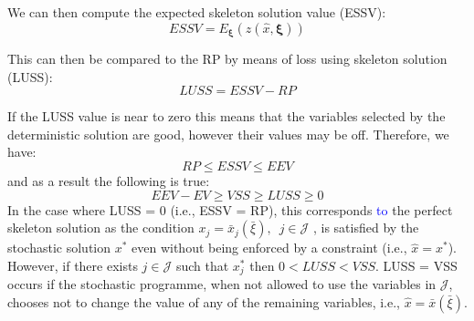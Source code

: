 \documentclass[../thesis.tex]{subfiles}
\begin{document}
{We can then compute the expected skeleton solution value (ESSV):
\vspace{-.1cm}
\begin{equation}\label{eq:ESSV}
    ESSV = E_{\boldsymbol{\xi}}(z(\hat x, \boldsymbol{\xi}))
\end{equation}

This can then be compared to the RP by means of loss using skeleton solution (LUSS):
\vspace{-0.1cm}
\begin{equation}\label{eq:LUSS}
    LUSS = ESSV - RP
\end{equation}

If the LUSS value is near to zero this means that the variables selected by the deterministic solution are good, however their values may be off. Therefore, we have:
\begin{equation}
    RP \leq ESSV \leq EEV
\end{equation}
and as a result the following is true:
\begin{equation}
    EEV - EV \geq VSS \geq LUSS \geq 0
\end{equation}
In the case where LUSS = 0 (i.e., ESSV = RP), this corresponds \textcolor{blue}{to} the perfect skeleton solution as the condition $x_{j} = \bar x_{j} (\bar \xi), \enspace j \in \mathcal{J}$ , is satisfied by the stochastic solution $x^{*}$ even without being enforced by a constraint (i.e., $\hat x = x^{*}$). However, if there exists $j \in \mathcal{J}$ such that $x^{*}_{j}$ then $0 < LUSS < VSS$. LUSS = VSS occurs if the stochastic programme, when not allowed to use the variables in $\mathcal{J}$, chooses not to change the value of any of the remaining variables, i.e., $\hat x = \bar x (\bar \xi)$.

}
\end{document}
